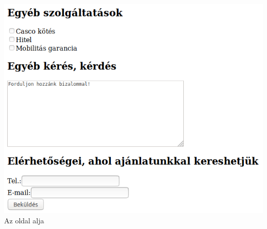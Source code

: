 \begin{frame}
\begin{columns}[c]
\begin{exampleblock}{\small {}}
\begin{columns}[T]
\begin{center}
              \includegraphics[width=\textwidth]{urlap8-2.png}\\
              \tiny Az oldal alja
            \end{center}
        \end{columns}
      \end{exampleblock}
  \end{columns}
\end{frame}
